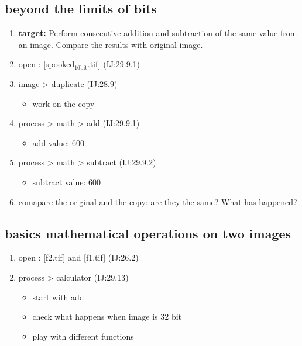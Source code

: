 \documentclass[11pt]{article}
\begin{document}
\subsection{beyond the limits of bits}
\label{sec-3-5}
\begin{enumerate}
\item \textbf{target:} Perform consecutive addition and subtraction of the
same value from an image. Compare the results with original image.
\item open : [spooked$_{\text{16bit}}$.tif] (IJ:29.9.1)
\item image > duplicate (IJ:28.9)
\begin{itemize}
\item work on the copy
\end{itemize}
\item process > math > add (IJ:29.9.1)
\begin{itemize}
\item add value: 600
\end{itemize}
\item process > math > subtract (IJ:29.9.2)
\begin{itemize}
\item subtract value: 600
\end{itemize}
\item comapare the original and the copy: are they the same? What has happened?
\end{enumerate}
\subsection{basics mathematical operations on two images}
\label{sec-3-6}
\begin{enumerate}
\item open : [f2.tif] and [f1.tif] (IJ:26.2)
\item process > calculator (IJ:29.13)
\begin{itemize}
\item start with add
\item check what happens when image is 32 bit
\item play with different functions
\end{itemize}
\end{enumerate}
\end{document}
